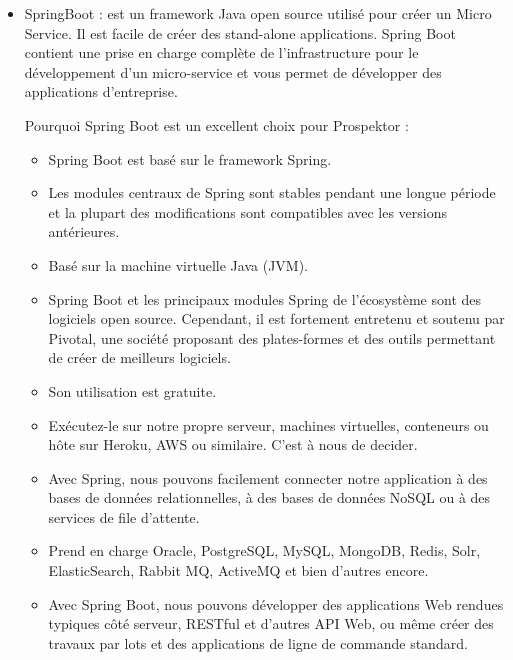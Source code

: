 \begin{itemize}

\item \textcolor{spring}{SpringBoot} : est un framework Java open source utilis\'e pour cr\'eer un Micro Service. Il est facile de cr\'eer des stand-alone applications. Spring Boot contient une prise en charge compl\`ete de l'infrastructure pour le d\'eveloppement d'un micro-service et vous permet de d\'evelopper des applications d'entreprise.

Pourquoi Spring Boot est un excellent choix pour Prospektor :

\begin{itemize}
\item Spring Boot est bas\'e sur le framework Spring.

\item Les modules centraux de Spring sont stables pendant une longue p\'eriode et la plupart des modifications sont compatibles avec les versions ant\'erieures.

\item Bas\'e sur la machine virtuelle Java (JVM).

\item Spring Boot et les principaux modules Spring de l'\'ecosyst\`eme sont des logiciels open source. Cependant, il est fortement entretenu et soutenu par Pivotal, une soci\'et\'e proposant des plates-formes et des outils permettant de cr\'eer de meilleurs logiciels.

\item Son utilisation est gratuite.

\item Ex\'ecutez-le sur notre propre serveur, machines virtuelles, conteneurs ou h\^ote sur Heroku, AWS ou similaire. C'est \`a nous de decider.

\item Avec Spring, nous pouvons facilement connecter notre application \`a des bases de donn\'ees relationnelles, \`a des bases de donn\'ees NoSQL ou \`a des services de file d'attente.

\item Prend en charge Oracle, PostgreSQL, MySQL, MongoDB, Redis, Solr, ElasticSearch, Rabbit MQ, ActiveMQ et bien d'autres encore.

\item Avec Spring Boot, nous pouvons d\'evelopper des applications Web rendues typiques c\^ot\'e serveur, RESTful et d'autres \gls{API} Web, ou m\^eme cr\'eer des travaux par lots et des applications de ligne de commande standard.


\end{itemize}
\end{itemize}
